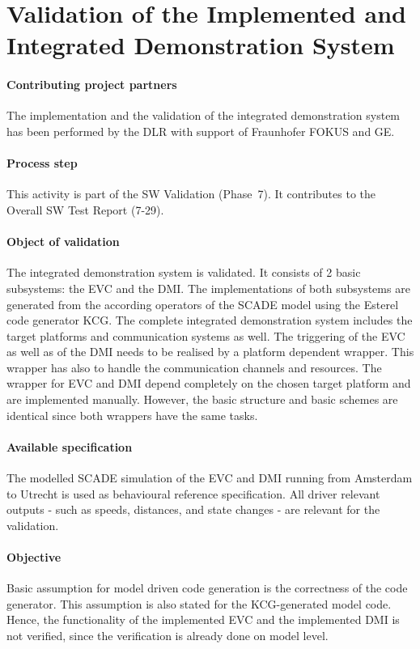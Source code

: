 \clearpage

\section{Validation of the Implemented and Integrated Demonstration System}
\label{sec:VnV-Validation-DLR}


\paragraph{Contributing project partners}
The implementation and the validation of the integrated demonstration
system has been performed by the DLR with support of Fraunhofer FOKUS and
GE.


\paragraph{Process step}
This activity is part of the SW Validation (Phase~7). It contributes
to the Overall SW Test Report (7-29).


\paragraph{Object of validation}
The integrated demonstration system is validated. It consists of 2
basic subsystems: the EVC and the DMI. The implementations of both
subsystems are generated from the according operators of the SCADE
model using the Esterel code generator KCG. The complete integrated
demonstration system includes the target platforms and communication
systems as well. The triggering of the EVC as well as of the DMI needs
to be realised by a platform dependent wrapper. This wrapper has also
to handle the communication channels and resources. The wrapper for
EVC and DMI depend completely on the chosen target platform and are
implemented manually. However, the basic structure and basic schemes
are identical since both wrappers have the same tasks.


\paragraph{Available specification}
The modelled SCADE simulation of the EVC and DMI running from
Amsterdam to Utrecht is used as behavioural reference
specification. All driver relevant outputs - such as speeds,
distances, and state changes - are relevant for the validation.


\paragraph{Objective}
Basic assumption for model driven code generation is the correctness
of the code generator. This assumption is also stated for the
KCG-generated model code. Hence, the functionality of the implemented
EVC and the implemented DMI is not verified, since the verification is
already done on model level.


